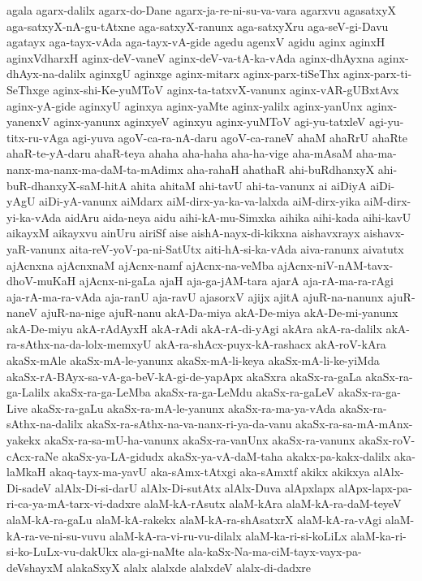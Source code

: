 {agala
agarx-dalilx
agarx-do-Dane
agarx-ja-re-ni-su-va-vara
agarxvu
agasatxyX
aga-satxyX-nA-gu-tAtxne
aga-satxyX-ranunx
aga-satxyXru
aga-seV-gi-Davu
agatayx
aga-tayx-vAda
aga-tayx-vA-gide
agedu
agenxV
agidu
aginx
aginxH
aginxVdharxH
aginx-deV-vaneV
aginx-deV-va-tA-ka-vAda
aginx-dhAyxna
aginx-dhAyx-na-dalilx
aginxgU
aginxge
aginx-mitarx
aginx-parx-tiSeThx
aginx-parx-ti-SeThxge
aginx-shi-Ke-yuMToV
aginx-ta-tatxvX-vanunx
aginx-vAR-gUBxtAvx
aginx-yA-gide
aginxyU
aginxya
aginx-yaMte
aginx-yalilx
aginx-yanUnx
aginx-yanenxV
aginx-yanunx
aginxyeV
aginxyu
aginx-yuMToV
agi-yu-tatxleV
agi-yu-titx-ru-vAga
agi-yuva
agoV-ca-ra-nA-daru
agoV-ca-raneV
ahaM
ahaRrU
ahaRte
ahaR-te-yA-daru
ahaR-teya
ahaha
aha-haha
aha-ha-vige
aha-mAsaM
aha-ma-nanx-ma-nanx-ma-daM-ta-mAdimx
aha-rahaH
ahathaR
ahi-buRdhanxyX
ahi-buR-dhanxyX-saM-hitA
ahita
ahitaM
ahi-tavU
ahi-ta-vanunx
ai
aiDiyA
aiDi-yAgU
aiDi-yA-vanunx
aiMdarx
aiM-dirx-ya-ka-va-lalxda
aiM-dirx-yika
aiM-dirx-yi-ka-vAda
aidAru
aida-neya
aidu
aihi-kA-mu-Simxka
aihika
aihi-kada
aihi-kavU
aikayxM
aikayxvu
ainUru
airiSf
aise
aishA-nayx-di-kikxna
aishavxrayx
aishavx-yaR-vanunx
aita-reV-yoV-pa-ni-SatUtx
aiti-hA-si-ka-vAda
aiva-ranunx
aivatutx
ajAcnxna
ajAcnxnaM
ajAcnx-namf
ajAcnx-na-veMba
ajAcnx-niV-nAM-tavx-dhoV-muKaH
ajAcnx-ni-gaLa
ajaH
aja-ga-jAM-tara
ajarA
aja-rA-ma-ra-rAgi
aja-rA-ma-ra-vAda
aja-ranU
aja-ravU
ajasorxV
ajijx
ajitA
ajuR-na-nanunx
ajuR-naneV
ajuR-na-nige
ajuR-nanu
akA-Da-miya
akA-De-miya
akA-De-mi-yanunx
akA-De-miyu
akA-rAdAyxH
akA-rAdi
akA-rA-di-yAgi
akAra
akA-ra-dalilx
akA-ra-sAthx-na-da-lolx-memxyU
akA-ra-shAcx-puyx-kA-rashacx
akA-roV-kAra
akaSx-mAle
akaSx-mA-le-yanunx
akaSx-mA-li-keya
akaSx-mA-li-ke-yiMda
akaSx-rA-BAyx-sa-vA-ga-beV-kA-gi-de-yapApx
akaSxra
akaSx-ra-gaLa
akaSx-ra-ga-Lalilx
akaSx-ra-ga-LeMba
akaSx-ra-ga-LeMdu
akaSx-ra-gaLeV
akaSx-ra-ga-Live
akaSx-ra-gaLu
akaSx-ra-mA-le-yanunx
akaSx-ra-ma-ya-vAda
akaSx-ra-sAthx-na-dalilx
akaSx-ra-sAthx-na-va-nanx-ri-ya-da-vanu
akaSx-ra-sa-mA-mAnx-yakekx
akaSx-ra-sa-mU-ha-vanunx
akaSx-ra-vanUnx
akaSx-ra-vanunx
akaSx-roV-cAcx-raNe
akaSx-ya-LA-gidudx
akaSx-ya-vA-daM-taha
akakx-pa-kakx-dalilx
aka-laMkaH
akaq-tayx-ma-yavU
aka-sAmx-tAtxgi
aka-sAmxtf
akikx
akikxya
alAlx-Di-sadeV
alAlx-Di-si-darU
alAlx-Di-sutAtx
alAlx-Duva
alApxlapx
alApx-lapx-pa-ri-ca-ya-mA-tarx-vi-dadxre
alaM-kA-rAsutx
alaM-kAra
alaM-kA-ra-daM-teyeV
alaM-kA-ra-gaLu
alaM-kA-rakekx
alaM-kA-ra-shAsatxrX
alaM-kA-ra-vAgi
alaM-kA-ra-ve-ni-su-vuvu
alaM-kA-ra-vi-ru-vu-dilalx
alaM-ka-ri-si-koLiLx
alaM-ka-ri-si-ko-LuLx-vu-dakUkx
ala-gi-naMte
ala-kaSx-Na-ma-ciM-tayx-vayx-pa-deVshayxM
alakaSxyX
alalx
alalxde
alalxdeV
alalx-di-dadxre
}
